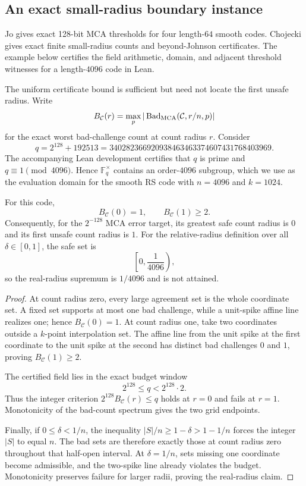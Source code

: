 \subsection{An exact small-radius boundary instance}
\label{sec:mca-boundary-field}

Jo \cite{jo2026beyondJohnson} gives exact 128-bit MCA thresholds for four
length-\(64\) smooth codes. Chojecki \cite{chojecki2026shortening,chojecki2026thresholds}
gives exact finite small-radius counts and beyond-Johnson certificates.
The example below certifies the field arithmetic, domain, and adjacent
threshold witnesses for a length-\(4096\) code in Lean.

The uniform certificate bound is sufficient but need not locate the first
unsafe radius.  Write
\[
  B_{\mathcal C}(r)
  =
  \max_p|\operatorname{Bad}_{\operatorname{MCA}}(\mathcal C,r/n,p)|
\]
for the exact worst bad-challenge count at count radius \(r\).  Consider
\[
  q=2^{128}+192513
   =340282366920938463463374607431768403969.
\]
The accompanying Lean development certifies that \(q\) is prime and
\(q\equiv1\pmod {4096}\).  Hence \(\mathbb F_q^\times\) contains an
order-\(4096\) subgroup, which we use as the evaluation domain for the smooth
RS code with \(n=4096\) and \(k=1024\).

\begin{theorem}
\label{thm:mca-boundary-threshold}
For this code,
\[
  B_{\mathcal C}(0)=1,
  \qquad
  B_{\mathcal C}(1)\ge2.
\]
Consequently, for the \(2^{-128}\) MCA error target, its greatest safe count
radius is \(0\) and its first unsafe count radius is \(1\).
For the relative-radius definition over
all \(\delta\in[0,1]\), the safe set is
\[
  \left[0,\frac1{4096}\right),
\]
so the real-radius supremum is \(1/4096\) and is not attained.
\end{theorem}

\begin{proof}
At count radius zero, every large agreement set is the whole coordinate set.
A fixed set supports at most one bad challenge, while a unit-spike affine
line realizes one; hence \(B_{\mathcal C}(0)=1\).  At count radius one, take
two coordinates outside a \(k\)-point interpolation set.  The affine line
from the unit spike at the first coordinate to the unit spike at the second
has distinct bad challenges \(0\) and \(1\), proving
\(B_{\mathcal C}(1)\ge2\).

The certified field lies in the exact budget window
\[
  2^{128}\le q<2^{128}\cdot2.
\]
Thus the integer criterion \(2^{128}B_{\mathcal C}(r)\le q\) holds at
\(r=0\) and fails at \(r=1\).  Monotonicity of the bad-count spectrum gives
the two grid endpoints.

Finally, if \(0\le\delta<1/n\), the inequality
\(|S|/n\ge1-\delta>1-1/n\) forces the integer \(|S|\) to equal \(n\).
The bad sets are therefore exactly those at count radius zero throughout
that half-open interval.  At \(\delta=1/n\), sets missing one coordinate
become admissible, and the two-spike line already violates the budget.
Monotonicity preserves failure for larger radii, proving the real-radius
claim.
\end{proof}

